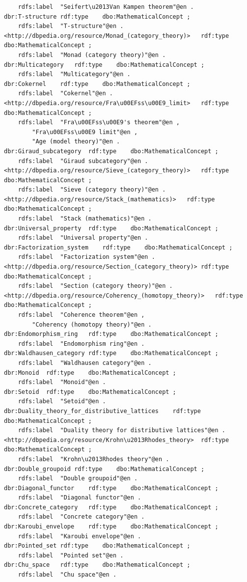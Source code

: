 \begin{verbatim}
	rdfs:label	"Seifert\u2013Van Kampen theorem"@en .
dbr:T-structure	rdf:type	dbo:MathematicalConcept ;
	rdfs:label	"T-structure"@en .
<http://dbpedia.org/resource/Monad_(category_theory)>	rdf:type	dbo:MathematicalConcept ;
	rdfs:label	"Monad (category theory)"@en .
dbr:Multicategory	rdf:type	dbo:MathematicalConcept ;
	rdfs:label	"Multicategory"@en .
dbr:Cokernel	rdf:type	dbo:MathematicalConcept ;
	rdfs:label	"Cokernel"@en .
<http://dbpedia.org/resource/Fra\u00EFss\u00E9_limit>	rdf:type	dbo:MathematicalConcept ;
	rdfs:label	"Fra\u00EFss\u00E9's theorem"@en ,
		"Fra\u00EFss\u00E9 limit"@en ,
		"Age (model theory)"@en .
dbr:Giraud_subcategory	rdf:type	dbo:MathematicalConcept ;
	rdfs:label	"Giraud subcategory"@en .
<http://dbpedia.org/resource/Sieve_(category_theory)>	rdf:type	dbo:MathematicalConcept ;
	rdfs:label	"Sieve (category theory)"@en .
<http://dbpedia.org/resource/Stack_(mathematics)>	rdf:type	dbo:MathematicalConcept ;
	rdfs:label	"Stack (mathematics)"@en .
dbr:Universal_property	rdf:type	dbo:MathematicalConcept ;
	rdfs:label	"Universal property"@en .
dbr:Factorization_system	rdf:type	dbo:MathematicalConcept ;
	rdfs:label	"Factorization system"@en .
<http://dbpedia.org/resource/Section_(category_theory)>	rdf:type	dbo:MathematicalConcept ;
	rdfs:label	"Section (category theory)"@en .
<http://dbpedia.org/resource/Coherency_(homotopy_theory)>	rdf:type	dbo:MathematicalConcept ;
	rdfs:label	"Coherence theorem"@en ,
		"Coherency (homotopy theory)"@en .
dbr:Endomorphism_ring	rdf:type	dbo:MathematicalConcept ;
	rdfs:label	"Endomorphism ring"@en .
dbr:Waldhausen_category	rdf:type	dbo:MathematicalConcept ;
	rdfs:label	"Waldhausen category"@en .
dbr:Monoid	rdf:type	dbo:MathematicalConcept ;
	rdfs:label	"Monoid"@en .
dbr:Setoid	rdf:type	dbo:MathematicalConcept ;
	rdfs:label	"Setoid"@en .
dbr:Duality_theory_for_distributive_lattices	rdf:type	dbo:MathematicalConcept ;
	rdfs:label	"Duality theory for distributive lattices"@en .
<http://dbpedia.org/resource/Krohn\u2013Rhodes_theory>	rdf:type	dbo:MathematicalConcept ;
	rdfs:label	"Krohn\u2013Rhodes theory"@en .
dbr:Double_groupoid	rdf:type	dbo:MathematicalConcept ;
	rdfs:label	"Double groupoid"@en .
dbr:Diagonal_functor	rdf:type	dbo:MathematicalConcept ;
	rdfs:label	"Diagonal functor"@en .
dbr:Concrete_category	rdf:type	dbo:MathematicalConcept ;
	rdfs:label	"Concrete category"@en .
dbr:Karoubi_envelope	rdf:type	dbo:MathematicalConcept ;
	rdfs:label	"Karoubi envelope"@en .
dbr:Pointed_set	rdf:type	dbo:MathematicalConcept ;
	rdfs:label	"Pointed set"@en .
dbr:Chu_space	rdf:type	dbo:MathematicalConcept ;
	rdfs:label	"Chu space"@en .

\end{verbatim}
